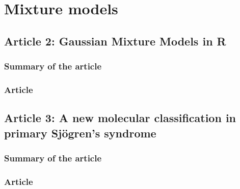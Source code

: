 \chapter{Mixture models}


\section{Article 2: Gaussian Mixture Models in R}
\subsection{Summary of the article}
\subsection{Article}

\section{Article 3: A new molecular classification in primary Sjögren’s syndrome}
\label{sec:sjogren-clustering}
\subsection{Summary of the article}
\subsection{Article}